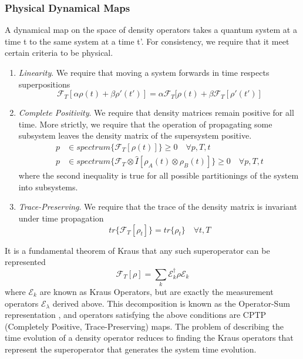 \subsubsection{Physical Dynamical Maps}
A dynamical map on the space of density operators takes a quantum system at a time t to the same system at a time t'.
For consistency, we require that it meet certain criteria to be physical.
\begin{enumerate}
    \item \emph{Linearity}. We require that moving a system forwards in time respects superpositions 
        \begin{equation}
            \mathscr{F}_T[\alpha\rho(t) + \beta\rho'(t')] = \alpha \mathscr{F}_T[\rho(t) + \beta \mathscr{F}_T[\rho'(t')]
        \end{equation}
    \item \emph{Complete Positivity}.  We require that density matrices remain positive for all time.
        More strictly, we require that the operation of propagating some subsystem leaves the density matrix of the supersystem positive.
        \begin{align}
            p & \in  spectrum \{\mathscr{F}_T[\rho(t)]\} \geq  0\quad \forall p, T, t\\
            p & \in  spectrum \{\mathscr{F}_T \otimes \hat{I} [\rho_A(t) \otimes\rho_B(t) ] \} \geq 0 \quad \forall p, T, t
        \end{align}
        where the second inequality is true for all possible partitionings of the system into subsystems.
    \item \emph{Trace-Preserving}. We require that the trace of the density matrix is invariant under time propagation
        \begin{equation}
            tr\{ \mathscr{F}_T[\rho_t] \} = tr \{ \rho_t \} \quad \forall t, T
        \end{equation}
\end{enumerate}
It is a fundamental theorem of Kraus \cite{Kraus1983} that any such superoperator can be represented \cite{Nielsen2010}
\begin{equation}
    \mathscr{F}_T[\rho] = \sum_k \mathscr{E}_k^\dagger \rho \mathscr{E}_k
\end{equation}
where $\mathscr{E}_k $ are known as Kraus Operators, but are exactly the measurement operators $\mathscr{E}_\lambda$ derived above.
This decomposition is known as the Operator-Sum representation \cite{Nielsen2010}, and operators satisfying the above conditions are CPTP (Completely Positive, Trace-Preserving) maps.
The problem of describing the time evolution of a density operator reduces to finding the Kraus operators that represent the superoperator that generates the system time evolution.

